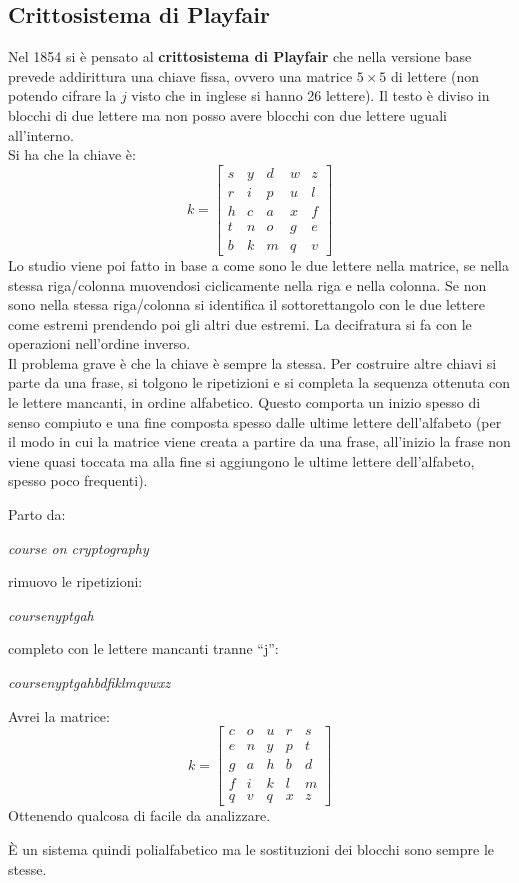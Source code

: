 \documentclass[a4paper,12pt, oneside]{book}
\begin{document}
\subsection{Crittosistema di Playfair}
Nel 1854 si è pensato al \textbf{crittosistema di Playfair} che nella versione
base prevede addirittura una chiave fissa, ovvero una matrice $5\times 5$ di
lettere (non potendo cifrare la $j$ visto che in inglese si hanno 26
lettere). Il testo è diviso in blocchi di due lettere ma non posso avere blocchi
con due lettere uguali all'interno.\\
Si ha che la chiave è:
\[k=\left[
    \begin{matrix}
      s & y & d & w & z\\
      r & i & p & u & l\\
      h & c & a & x & f\\
      t & n & o & g & e\\
      b & k & m & q & v
    \end{matrix}
  \right]\]
Lo studio viene poi fatto in base a come sono le due lettere nella matrice, se
nella stessa riga/colonna muovendosi ciclicamente nella riga e nella colonna. Se
non sono nella stessa riga/colonna si identifica 
il sottorettangolo con le due lettere come estremi prendendo poi gli altri due
estremi. La decifratura si fa con le operazioni nell'ordine inverso.\\
Il problema grave è che la chiave è sempre la stessa. Per costruire altre chiavi
si parte da una frase, si tolgono le ripetizioni e si completa la sequenza
ottenuta con le lettere mancanti, in ordine alfabetico. Questo comporta un
inizio spesso di senso compiuto e una fine composta spesso dalle ultime lettere
dell'alfabeto (per il modo in cui la matrice viene creata a partire da una
frase, all'inizio la frase non viene quasi toccata ma alla fine si aggiungono
le ultime lettere dell'alfabeto, spesso poco frequenti).\\
\begin{esempio}
  Parto da:
  \begin{center}
    \textit{course on cryptography}
  \end{center}
  rimuovo le ripetizioni:
  \begin{center}
    \textit{coursenyptgah}
  \end{center}
  completo con le lettere mancanti tranne ``j'':
  \begin{center}
    \textit{coursenyptgahbdfiklmqvwxz}
  \end{center}
  Avrei la matrice:
  \[k=\left[
    \begin{matrix}
      c & o & u & r & s\\
      e & n & y & p & t\\
      g & a & h & b & d\\
      f & i & k & l & m\\
      q & v & q & x & z
    \end{matrix}
  \right]
\]
Ottenendo qualcosa di facile da analizzare.
\end{esempio}
È un sistema quindi polialfabetico ma le sostituzioni dei blocchi sono sempre le
stesse.
\end{document}
